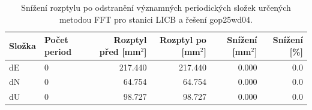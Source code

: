 \begin{table}[htbp]
\caption{Snížení rozptylu po odstranění významných periodických složek určených metodou FFT pro stanici LICB a řešení gop25wd04.}
\label{tab:gop25wd04_stcd_licb_detr_weighted_1seg_spectral_fft_variance_reduction}
\begin{tabular}{llrrrr}
\toprule
Složka & Počet period & Rozptyl před [mm$^2$] & Rozptyl po [mm$^2$] & Snížení [mm$^2$] & Snížení [\%] \\
\midrule
dE & 0 & 217.440 & 217.440 & 0.000 & 0.0 \\
dN & 0 & 64.754 & 64.754 & 0.000 & 0.0 \\
dU & 0 & 98.727 & 98.727 & 0.000 & 0.0 \\
\bottomrule
\end{tabular}
\end{table}
